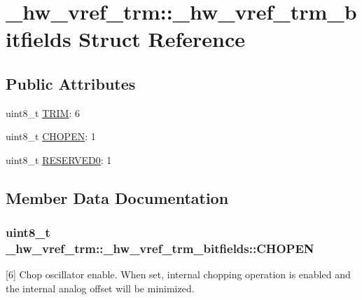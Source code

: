 \hypertarget{struct__hw__vref__trm_1_1__hw__vref__trm__bitfields}{}\section{\+\_\+hw\+\_\+vref\+\_\+trm\+:\+:\+\_\+hw\+\_\+vref\+\_\+trm\+\_\+bitfields Struct Reference}
\label{struct__hw__vref__trm_1_1__hw__vref__trm__bitfields}
\subsection*{Public Attributes}
\begin{DoxyCompactItemize}
\item 
uint8\+\_\+t \hyperlink{struct__hw__vref__trm_1_1__hw__vref__trm__bitfields_a4ba10cc47cc2f260570e053bd7e61294}{T\+R\+IM}\+: 6
\item 
uint8\+\_\+t \hyperlink{struct__hw__vref__trm_1_1__hw__vref__trm__bitfields_ac24bebc22f2d577e060131a3a4329390}{C\+H\+O\+P\+EN}\+: 1
\item 
uint8\+\_\+t \hyperlink{struct__hw__vref__trm_1_1__hw__vref__trm__bitfields_a6d0a0fecf9bd54d757fd30c438ff3dbb}{R\+E\+S\+E\+R\+V\+E\+D0}\+: 1
\end{DoxyCompactItemize}


\subsection{Member Data Documentation}
\subsubsection[{\texorpdfstring{C\+H\+O\+P\+EN}{CHOPEN}}]{\setlength{\rightskip}{0pt plus 5cm}uint8\+\_\+t \+\_\+hw\+\_\+vref\+\_\+trm\+::\+\_\+hw\+\_\+vref\+\_\+trm\+\_\+bitfields\+::\+C\+H\+O\+P\+EN}\hypertarget{struct__hw__vref__trm_1_1__hw__vref__trm__bitfields_ac24bebc22f2d577e060131a3a4329390}{}\label{struct__hw__vref__trm_1_1__hw__vref__trm__bitfields_ac24bebc22f2d577e060131a3a4329390}
\mbox{[}6\mbox{]} Chop oscillator enable. When set, internal chopping operation is enabled and the internal analog offset will be minimized. 
